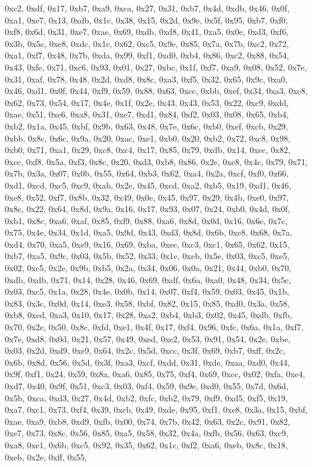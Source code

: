 \documentclass[
]{book}
\begin{document}
0xc2, 0xdf, 0x17, 0xb7, 0xa9, 0xca, 0x27, 0x31, 0xb7, 0x4d, 0xdb, 0x46, 0x0f, 0xa1, 0xe7, 0x13, 0xdb, 0x1c, 0x38, 0x15, 0x2d, 0x9e, 0x5f, 0x95, 0xb7, 0xf0, 0xf8, 0x6d, 0x31, 0xe7, 0xae, 0x69, 0xdb, 0xd8, 0x41, 0xa5, 0x0e, 0xd3, 0xf6, 0x3b, 0x5c, 0xe8, 0xdc, 0x1c, 0x62, 0xc5, 0x9e, 0x85, 0x7a, 0x7b, 0xc2, 0x72, 0xa1, 0xf7, 0x48, 0x7b, 0xda, 0x99, 0xf1, 0xd0, 0xb4, 0x86, 0xc2, 0x88, 0x54, 0x43, 0xfe, 0x71, 0xc6, 0x93, 0x01, 0x27, 0xbc, 0x1f, 0xf7, 0xa9, 0x08, 0x52, 0x7e, 0x31, 0xaf, 0x78, 0x48, 0x2d,
0xd8, 0x8c, 0xa3, 0xf5, 0x32, 0x65, 0x9c, 0xa0, 0x46, 0xd1, 0x0f, 0x44, 0xf9, 0x59, 0x88, 0x63, 0xcc, 0xbb, 0xef, 0x34, 0xa3, 0xc8, 0x62, 0x73, 0x54, 0x17, 0x4e, 0x1f, 0x2e, 0x43, 0x43, 0x53, 0x22, 0xc9, 0xdd, 0xae, 0x51, 0xe6, 0xa8, 0x31, 0xe7, 0xd1, 0x84, 0xf2, 0x03, 0x08, 0x65, 0xb4, 0xb2, 0x1a, 0x45, 0xbf, 0x9b, 0x63, 0x48, 0x7e, 0x6c, 0xb0, 0xef, 0xcb, 0x29, 0xbb, 0x8c, 0x6c, 0x9a, 0x20, 0xac, 0xe1, 0xb0, 0x20, 0xb2, 0x72, 0xc8, 0x98, 0xb0, 0x71, 0xa1, 0x29, 0xc8, 0xc4, 0x17, 0x85, 0x79, 0xdb,
0x14, 0xec, 0x82, 0xcc, 0xf8, 0x5a, 0xf3, 0x8c, 0x20, 0xd3, 0xb8, 0x86, 0x2e, 0xc8, 0x4c, 0x79, 0x71, 0x7b, 0x3a, 0x07, 0x0b, 0x55, 0x64, 0xb3, 0x62, 0xa4, 0x2a, 0xcf, 0xf0, 0x66, 0xd1, 0xcd, 0xc5, 0xc9, 0xab, 0x2e, 0x45, 0xcd, 0xa2, 0xb5, 0x19, 0xd1, 0x46, 0xe8, 0x52, 0xf7, 0x8b, 0x32, 0x49, 0x0e, 0x45, 0x97, 0x29, 0x4b, 0xe0, 0x97, 0x8c, 0x22, 0x64, 0x8d, 0x9a, 0x16, 0x17, 0x93, 0x07, 0x24, 0xb0, 0x4d, 0x0f, 0xb1, 0x8c, 0xa6, 0xaf, 0x85, 0xf9, 0x88, 0xa6, 0x8d, 0x0d, 0x16, 0x6e, 0x7c, 0x75, 0x4e,
0x34, 0x1d, 0xa5, 0x9d, 0x43, 0xd3, 0x8d, 0x6b, 0xe8, 0x68, 0x7a, 0xd4, 0x70, 0xa5, 0xe9, 0x16, 0x69, 0xba, 0xee, 0xc3, 0xc1, 0x65, 0x62, 0x15, 0xb7, 0xa5, 0x9c, 0x03, 0x5b, 0x52, 0x33, 0x1e, 0xeb, 0x5e, 0x03, 0xc5, 0xe5, 0x02, 0xc5, 0x2e, 0x9b, 0xb5, 0x2a, 0x34, 0x06, 0x0a, 0x21, 0x44, 0xb0, 0x70, 0xdb, 0xdb, 0x71, 0x14, 0x28, 0x46, 0x69, 0xdf, 0x6a, 0xa0, 0x48, 0x34, 0x5c, 0x03, 0xc5, 0x1a, 0x28, 0x4e, 0x0b, 0x14, 0x07, 0xf4, 0x59, 0x03, 0x45, 0x1b, 0x83, 0x3c, 0x0d, 0x14, 0xe3, 0x58, 0xbf, 0x82,
0x15, 0x85, 0xd0, 0x3a, 0x58, 0xb8, 0xed, 0xa3, 0x10, 0x17, 0x28, 0xa2, 0xb4, 0xb3, 0x02, 0x45, 0xdb, 0xfb, 0x70, 0x2e, 0x50, 0x8c, 0xfd, 0xe1, 0x4f, 0x17, 0xf4, 0x96, 0xfc, 0x6a, 0x1a, 0xf7, 0x7e, 0xd8, 0x0d, 0x21, 0x57, 0x49, 0xed, 0xe2, 0x53, 0x91, 0x54, 0x2e, 0xbe, 0x03, 0x2d, 0xd9, 0xe9, 0x64, 0x2c, 0x5d, 0xcc, 0x3f, 0x69, 0xb7, 0xff, 0x2c, 0x6b, 0x8d, 0x56, 0x5d, 0x3f, 0xa3, 0xcf, 0xdd, 0x31, 0xde, 0xaa, 0xd0, 0x44, 0x9f, 0xf1, 0x24, 0x59, 0x8a, 0xa6, 0x85, 0x75, 0xf4, 0x69, 0xcc, 0x02, 0xfa,
0xe4, 0xd7, 0x40, 0x9f, 0x51, 0xc3, 0x03, 0xf4, 0x59, 0x9e, 0xd0, 0x55, 0x7d, 0x6d, 0x5b, 0xca, 0xd3, 0x27, 0x4d, 0xb2, 0xfc, 0xb2, 0x79, 0xf9, 0xd5, 0xf5, 0x19, 0xa7, 0xc1, 0x73, 0xf4, 0x39, 0xcb, 0x49, 0xde, 0x95, 0xf1, 0xe8, 0x3a, 0x15, 0xbf, 0xae, 0xa9, 0xb8, 0xd9, 0xfb, 0x00, 0x74, 0x7b, 0x42, 0x63, 0x2c, 0x91, 0x82, 0xe7, 0x73, 0x8c, 0x56, 0x85, 0xa5, 0x58, 0x32, 0x4a, 0xfb, 0x56, 0x63, 0xc9, 0xa8, 0xe1, 0x6b, 0xc5, 0x92, 0x35, 0x62, 0x1c, 0xf2, 0xa6, 0xeb, 0x8c, 0x18, 0xeb, 0x2e, 0xff, 0x55,
\end{document}
